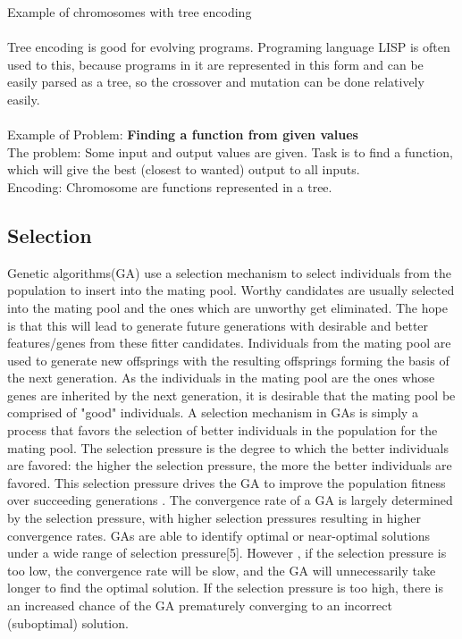 \documentclass[a4paper, 12pt]{article}
\begin{document}
Example of chromosomes with tree encoding\\~\\
Tree encoding is good for evolving programs. Programing language LISP is often used to this, because programs in it are represented in this form and can be easily parsed as a tree, so the crossover and mutation can be done relatively easily.\\~\\
Example of Problem: \textbf{Finding a function from given values}\\
The problem: Some input and output values are given. Task is to find a function, which will give the best (closest to wanted) output to all inputs.\\
Encoding: Chromosome are functions represented in a tree.
\subsection{Selection}
Genetic algorithms(GA) use a selection mechanism to select individuals from the population to insert into the mating pool. Worthy candidates are usually selected into the mating pool and the ones which are unworthy get eliminated. The hope is that this will lead to generate future generations with desirable and better features/genes from these fitter candidates. Individuals from the mating pool are used to generate new offsprings with the resulting offsprings forming the basis of the next generation. As the individuals in the mating pool are the ones whose genes are inherited by the next generation, it is desirable that the mating pool be comprised of "good" individuals. A selection mechanism in GAs is simply a process that favors the selection of better individuals in the population for the mating pool. 
The selection pressure is the degree to which the better individuals are favored: the higher the selection pressure, the more the better
individuals are favored. This selection pressure drives the GA to improve the population fitness over succeeding generations . The convergence
rate of a GA is largely determined by the selection pressure, with higher selection pressures resulting in higher convergence rates. GAs are 
able to identify optimal or near-optimal solutions under a wide range of selection pressure[5]. However , if the selection pressure is too low, the convergence rate will be slow, and the GA will unnecessarily take longer to find the optimal solution. If the selection pressure is too 
high, there is an increased chance of the GA prematurely converging to an incorrect (suboptimal) solution.
\end{document}

